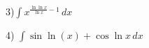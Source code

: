 \documentclass[11pt]{article}
\begin{document}
\pagebreak


3)${\displaystyle \int  x^{\frac{\ln{\ln{x}}}{\ln{x}}-1}\,dx}$ \newline

\pagebreak

4) ${\displaystyle \int \sin{\ln{\left(x\right)}} + \cos{\ln{x}} \,dx}$
\end{document}
